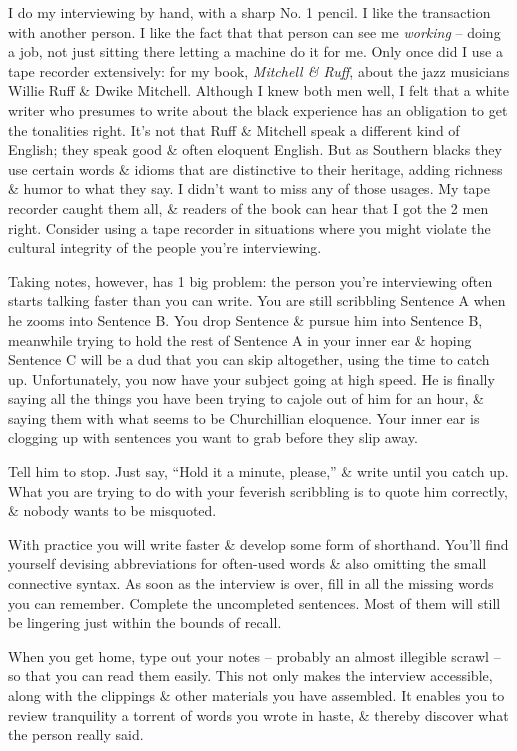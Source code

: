 \documentclass{article}
\begin{document}
I do my interviewing by hand, with a sharp No. 1 pencil. I like the transaction with another person. I like the fact that that person can see me \textit{working} -- doing a job, not just sitting there letting a machine do it for me. Only once did I use a tape recorder extensively: for my book, \textit{Mitchell \& Ruff}, about the jazz musicians Willie Ruff \& Dwike Mitchell. Although I knew both men well, I felt that a white writer who presumes to write about the black experience has an obligation to get the tonalities right. It's not that Ruff \& Mitchell speak a different kind of English; they speak good \& often eloquent English. But as Southern blacks they use certain words \& idioms that are distinctive to their heritage, adding richness \& humor to what they say. I didn't want to miss any of those usages. My tape recorder caught them all, \& readers of the book can hear that I got the 2 men right. Consider using a tape recorder in situations where you might violate the cultural integrity of the people you're interviewing.

Taking notes, however, has 1 big problem: the person you're interviewing often starts talking faster than you can write. You are still scribbling Sentence A when he zooms into Sentence B. You drop Sentence \& pursue him into Sentence B, meanwhile trying to hold the rest of Sentence A in your inner ear \& hoping Sentence C will be a dud that you can skip altogether, using the time to catch up. Unfortunately, you now have your subject going at high speed. He is finally saying all the things you have been trying to cajole out of him for an hour, \& saying them with what seems to be Churchillian eloquence. Your inner ear is clogging up with sentences you want to grab before they slip away.

Tell him to stop. Just say, ``Hold it a minute, please,'' \& write until you catch up. What you are trying to do with your feverish scribbling is to quote him correctly, \& nobody wants to be misquoted.

With practice you will write faster \& develop some form of shorthand. You'll find yourself devising abbreviations for often-used words \& also omitting the small connective syntax. As soon as the interview is over, fill in all the missing words you can remember. Complete the uncompleted sentences. Most of them will still be lingering just within the bounds of recall.

When you get home, type out your notes -- probably an almost illegible scrawl -- so that you can read them easily. This not only makes the interview accessible, along with the clippings \& other materials you have assembled. It enables you to review tranquility a torrent of words you wrote in haste, \& thereby discover what the person really said.
\end{document}
